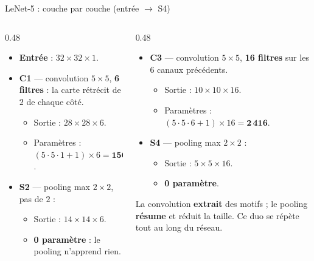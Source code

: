 \begin{frame}{LeNet-5 : couche par couche (entrée $\rightarrow$ S4)}
\begin{columns}[t]
\begin{column}{0.48\textwidth}
\begin{itemize}
  \item \textbf{Entrée} : $32 \times 32 \times 1$.
  \item \textbf{C1} --- convolution $5\times5$, \textbf{6 filtres} :
  la carte rétrécit de $2$ de chaque côté.
  \begin{itemize}
    \item Sortie : $28 \times 28 \times 6$.
    \item Paramètres : $(5\cdot 5\cdot 1 + 1)\times 6 = \mathbf{156}$.
  \end{itemize}
  \item \textbf{S2} --- pooling max $2\times2$, pas de $2$ :
  \begin{itemize}
    \item Sortie : $14 \times 14 \times 6$.
    \item \textbf{0 paramètre} : le pooling n'apprend rien.
  \end{itemize}
\end{itemize}
\end{column}
\begin{column}{0.48\textwidth}
\begin{itemize}
  \item \textbf{C3} --- convolution $5\times5$, \textbf{16 filtres} sur
  les 6 canaux précédents.
  \begin{itemize}
    \item Sortie : $10 \times 10 \times 16$.
    \item Paramètres : $(5\cdot 5\cdot 6 + 1)\times 16 = \mathbf{2\,416}$.
  \end{itemize}
  \item \textbf{S4} --- pooling max $2\times2$ :
  \begin{itemize}
    \item Sortie : $5 \times 5 \times 16$.
    \item \textbf{0 paramètre}.
  \end{itemize}
\end{itemize}
\begin{kbox}
La convolution \textbf{extrait} des motifs ; le pooling \textbf{résume}
et réduit la taille. Ce duo se répète tout au long du réseau.
\end{kbox}
\end{column}
\end{columns}
\end{frame}

